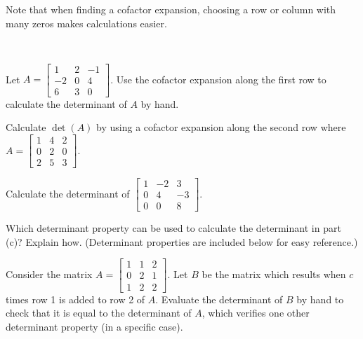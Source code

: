 Note that when finding a cofactor expansion, choosing a row or column with many zeros makes calculations easier.



\begin{activity} \label{act:4_a_1} ~
	\ba
	\item Let $A = \left[ \begin{array}{rcr} 1&2&-1 \\ -2&0&4 \\ 6&3&0  \end{array} \right]$. Use the cofactor expansion along the first row to calculate the determinant of $A$ by hand.


	\item Calculate $\det(A)$ by using a cofactor expansion along the second row where $A = \left[ \begin{array}{ccc} 1 & 4 & 2 \\ 0 & 2 & 0 \\ 2 & 5 & 3 \end{array} \right]$. 
	
	

	\item Calculate the determinant of $\left[ \begin{array}{crr} 1&-2&3 \\ 0&4&-3 \\ 0&0&8\end{array} \right]$. 
	
	
	
	\item Which determinant property can be used to calculate the determinant in part (c)? Explain how. (Determinant properties are included below for easy reference.)
	
	
	
	\item Consider the matrix $A=\left[ \begin{array}{ccc} 1 & 1 & 2 \\ 0 & 2 & 1 \\ 1 & 2 & 2 \end{array} \right]$. Let $B$ be the matrix which results when $c$ times row 1 is added to row 2 of $A$. Evaluate the determinant of $B$ by hand to check that it is equal to the determinant of $A$, which verifies one other determinant property (in a specific case).
	
	
	
	\ea

\end{activity}

